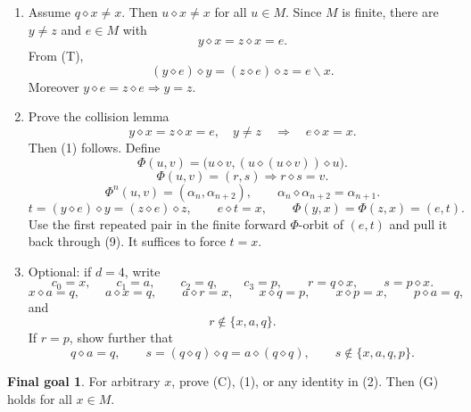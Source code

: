 \documentclass[12pt]{article}
\newcommand{\op}{\diamond}
\theoremstyle{definition}
\newtheorem*{goal}{Final goal}
\begin{document}
\begin{enumerate}[label=\textbf{\arabic*.}]
\item Assume $q\op x\ne x$.  Then $u\op x\ne x$ for all $u\in M$.  Since $M$ is finite,
there are $y\ne z$ and $e\in M$ with
\[
y\op x=z\op x=e. \tag{6}
\]
From (T),
\[
(y\op e)\op y=(z\op e)\op z=e\backslash x. \tag{7}
\]
Moreover $y\op e=z\op e\Rightarrow y=z$.

\item Prove the collision lemma
\[
\boxed{
y\op x=z\op x=e,\quad y\ne z
\quad\Longrightarrow\quad
e\op x=x.}
\tag{C}
\]
Then (1) follows.  Define
\[
\Phi(u,v)=\bigl(u\op v,
(u\op(u\op v))\op u\bigr).
\]
\[
\Phi(u,v)=(r,s)\Rightarrow
r\op s=v. \tag{8}
\]
\[
\Phi^n(u,v)=(\alpha_n,\alpha_{n+2}),
\qquad
\alpha_n\op\alpha_{n+2}=\alpha_{n+1}. \tag{9}
\]
\[
t=(y\op e)\op y=(z\op e)\op z,
\qquad
e\op t=x,
\qquad
\Phi(y,x)=\Phi(z,x)=(e,t). \tag{10}
\]
Use the first repeated pair in the finite forward $\Phi$-orbit of $(e,t)$ and pull it
back through (9).  It suffices to force $t=x$.

\item Optional: if $d=4$, write
\[
c_0=x,
\qquad
c_1=a,
\qquad
c_2=q,
\qquad
c_3=p,
\qquad
r=q\op x,
\qquad
s=p\op x.
\]
\[
x\op a=q,
\qquad
a\op x=q,
\qquad
a\op r=x,
\qquad
x\op q=p,
\qquad
x\op p=x,
\qquad
p\op a=q,
\]
and
\[
r\notin\{x,a,q\}. \tag{11}
\]
If $r=p$, show further that
\[
q\op a=q,
\qquad
s=(q\op q)\op q=a\op(q\op q),
\qquad
s\notin\{x,a,q,p\}. \tag{12}
\]
\end{enumerate}

\begin{goal}
For arbitrary $x$, prove (C), (1), or any identity in (2).  Then (G) holds for all
$x\in M$.
\end{goal}
\end{document}
